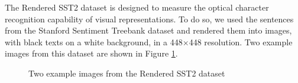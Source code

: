 \documentclass{article}
\begin{document}
The Rendered SST2 dataset is designed to measure the optical character recognition capability of visual representations. To do so, we used the sentences from the Stanford Sentiment Treebank dataset \citep{socher2013recursive} and rendered them into images, with black texts on a white background, in a 448$\times$448 resolution. Two example images from this dataset are shown in Figure \ref{rendered-sst2-fig}.

\begin{figure}[t]
    \centering
    \qquad
    \caption{Two example images from the Rendered SST2 dataset}
    \label{rendered-sst2-fig}
\end{figure}
\end{document}
